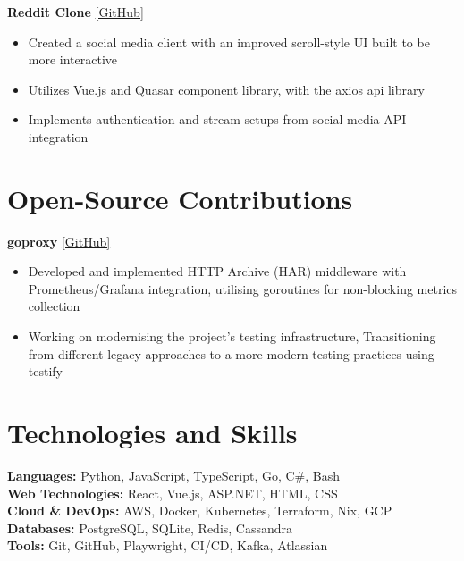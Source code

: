 \documentclass[10pt,a4paper]{article}
\begin{document}
	\textbf{Reddit Clone} \href{https://github.com/CameronBadman/Reddit-Clone}{[GitHub]}
	\begin{itemize}[label=\textbullet, itemsep=0.05cm]
		\item Created a social media client with an improved scroll-style UI built to be more interactive
		\item Utilizes Vue.js and Quasar component library, with the axios api library
		\item Implements authentication and stream setups from social media API integration
	\end{itemize}
	
	\section{Open-Source Contributions}
	\textbf{goproxy} \href{https://github.com/elazarl/goproxy}{[GitHub]}
	\begin{itemize}[label=\textbullet, itemsep=0.05cm]
		\item Developed and implemented HTTP Archive (HAR) middleware with Prometheus/Grafana integration, utilising goroutines for non-blocking metrics collection
		\item Working on modernising the project's testing infrastructure, Transitioning from different legacy approaches to a more modern testing practices using testify
	\end{itemize}
	
	\section{Technologies and Skills}
	\textbf{Languages:} Python, JavaScript, TypeScript, Go, C\#, Bash \\
	\hspace*{0.5cm}\textbf{Web Technologies:} React, Vue.js, ASP.NET, HTML, CSS \\
	\hspace*{0.5cm}\textbf{Cloud \& DevOps:} AWS, Docker, Kubernetes, Terraform, Nix, GCP \\
	\hspace*{0.5cm}\textbf{Databases:} PostgreSQL, SQLite, Redis, Cassandra \\
	\hspace*{0.5cm}\textbf{Tools:} Git, GitHub, Playwright, CI/CD, Kafka, Atlassian
	
\end{document}
